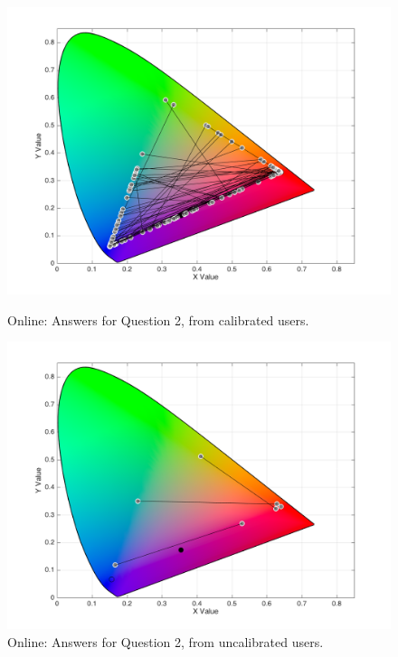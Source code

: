 \begin{figure}[!htbp]
  \centering
  \begin{minipage}{0.48\textwidth}
    \centering
    \includegraphics[width=\textwidth]{images/results/2_online_regularUsers.png}
    \caption[Online: Answers for Question 2, from calibrated users.]{Online: Answers for Question 2, from calibrated users.}
    \label{fig:uncal_1}
  \end{minipage}\hfill
  \begin{minipage}{0.48\textwidth}
    \centering
    \includegraphics[width=\textwidth]{images/results/2_online_uncalibratedUsers.png}
    \caption[Online: Answers for Question 2, from uncalibrated users.]{Online: Answers for Question 2, from uncalibrated users.}
    \label{fig:uncal_2}
  \end{minipage}
\end{figure} \par
